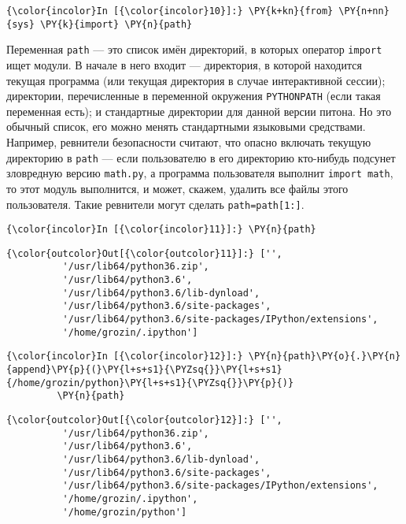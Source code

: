     \begin{Verbatim}[commandchars=\\\{\}]
{\color{incolor}In [{\color{incolor}10}]:} \PY{k+kn}{from} \PY{n+nn}{sys} \PY{k}{import} \PY{n}{path}
\end{Verbatim}

    Переменная \texttt{path} --- это список имён директорий, в которых
оператор \texttt{import} ищет модули. В начале в него входит
\texttt{\textquotesingle{}\textquotesingle{}} --- директория, в которой
находится текущая программа (или текущая директория в случае
интерактивной сессии); директории, перечисленные в переменной окружения
\texttt{PYTHONPATH} (если такая переменная есть); и стандартные
директории для данной версии питона. Но это обычный список, его можно
менять стандартными языковыми средствами. Например, ревнители
безопасности считают, что опасно включать текущую директорию в
\texttt{path} --- если пользователю в его директорию кто-нибудь подсунет
зловредную версию \texttt{math.py}, а программа пользователя выполнит
\texttt{import\ math}, то этот модуль выполнится, и может, скажем,
удалить все файлы этого пользователя. Такие ревнители могут сделать
\texttt{path=path{[}1:{]}}.

    \begin{Verbatim}[commandchars=\\\{\}]
{\color{incolor}In [{\color{incolor}11}]:} \PY{n}{path}
\end{Verbatim}

            \begin{Verbatim}[commandchars=\\\{\}]
{\color{outcolor}Out[{\color{outcolor}11}]:} ['',
          '/usr/lib64/python36.zip',
          '/usr/lib64/python3.6',
          '/usr/lib64/python3.6/lib-dynload',
          '/usr/lib64/python3.6/site-packages',
          '/usr/lib64/python3.6/site-packages/IPython/extensions',
          '/home/grozin/.ipython']
\end{Verbatim}
        
    \begin{Verbatim}[commandchars=\\\{\}]
{\color{incolor}In [{\color{incolor}12}]:} \PY{n}{path}\PY{o}{.}\PY{n}{append}\PY{p}{(}\PY{l+s+s1}{\PYZsq{}}\PY{l+s+s1}{/home/grozin/python}\PY{l+s+s1}{\PYZsq{}}\PY{p}{)}
         \PY{n}{path}
\end{Verbatim}

            \begin{Verbatim}[commandchars=\\\{\}]
{\color{outcolor}Out[{\color{outcolor}12}]:} ['',
          '/usr/lib64/python36.zip',
          '/usr/lib64/python3.6',
          '/usr/lib64/python3.6/lib-dynload',
          '/usr/lib64/python3.6/site-packages',
          '/usr/lib64/python3.6/site-packages/IPython/extensions',
          '/home/grozin/.ipython',
          '/home/grozin/python']
\end{Verbatim}
        
